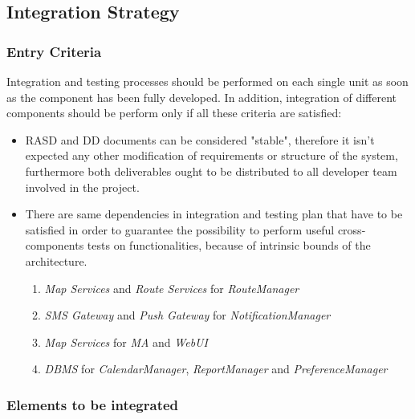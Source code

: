 
\subsection{Integration Strategy}

\subsubsection{Entry Criteria}

Integration and testing processes should be performed on each single unit as soon as the component has been fully developed. In addition, integration of different components should be perform only if all these criteria are satisfied:

\begin{itemize}
	\item RASD and DD documents can be considered "stable", therefore it isn't expected any other modification of requirements or structure of the system, furthermore both deliverables ought to be distributed to all developer team involved in the project.
	\item There are same dependencies in integration and testing plan that have to be satisfied in order to guarantee the possibility to perform useful cross-components tests on functionalities, because of intrinsic bounds of the architecture.
	\begin{enumerate}
		\item \textit{Map Services} and \textit{Route Services} for \textit{RouteManager}
		\item \textit{SMS Gateway} and \textit{Push Gateway} for \textit{NotificationManager}
		\item \textit{Map Services} for \textit{MA} and \textit{WebUI}
		\item \textit{DBMS} for \textit{CalendarManager}, \textit{ReportManager} and \textit{PreferenceManager}
		\end{enumerate}
\end{itemize}

\subsubsection{Elements to be integrated}

